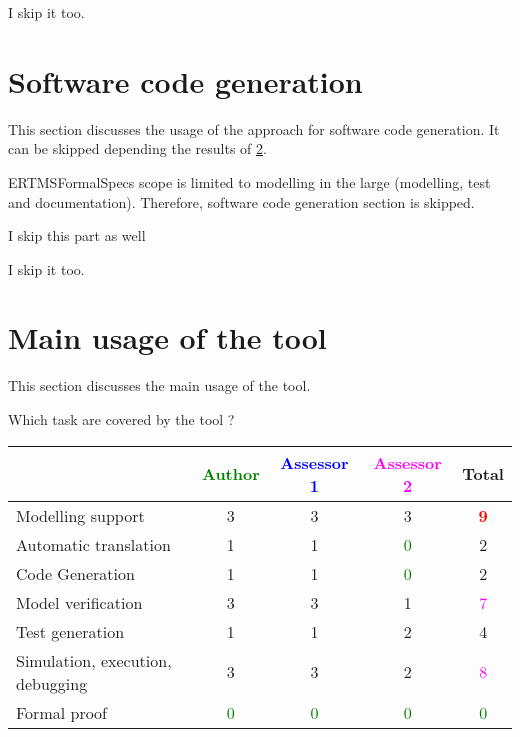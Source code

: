 \begin{assessor2}
I skip it too.
\end{assessor2}


\section{Software code generation}
This section discusses the usage of the approach for software code generation.
It can be skipped depending the results of \ref{main_usage}.

\begin{author_comment}
ERTMSFormalSpecs scope is limited to modelling in the large (modelling, test and documentation). Therefore, software code generation section is skipped.  
\end{author_comment}

\begin{assessor1}
I skip this part as well
\end{assessor1}


\begin{assessor2}
I skip it too.
\end{assessor2}


\section{Main usage of the tool}
\label{main_usage}

This section discusses the main usage of the tool.

Which task are covered by the tool ?

\begin{tabular}{|l | c | c | c | c|}
\hline
& \textcolor{green}{Author} & \textcolor{blue}{Assessor 1} & \textcolor{magenta}{Assessor 2} & Total \\
\hline 
Modelling support & 3    & 3    & 3    & \textcolor{red}{\textbf{9}} \\
\hline
Automatic translation  & 1    & 1    & \textcolor{green}{0} & 2    \\
\hline
Code Generation  & 1    & 1    & \textcolor{green}{0} & 2    \\
\hline
Model verification & 3    & 3    & 1    & \textcolor{magenta}{7} \\
\hline
Test generation & 1    & 1    & 2    & 4    \\
\hline
Simulation, execution, debugging & 3    & 3    & 2    & \textcolor{magenta}{8} \\
\hline
Formal proof & \textcolor{green}{0} & \textcolor{green}{0} & \textcolor{green}{0} & \textcolor{green}{0} \\
\hline
\end{tabular}



